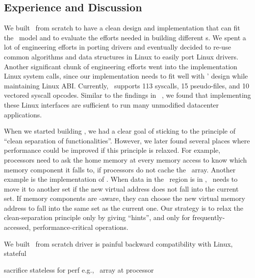 \documentclass[10pt,times,twocolumn]{z2-article}
\begin{document}
{{{{{{{\subsection{Experience and Discussion}
We built \lego\ from scratch to have a clean design and implementation that 
can fit the \splitkernel\ model
and to evaluate the efforts needed in building different \microos{}s.
We spent a lot of engineering efforts in porting drivers
and eventually decided to re-use common algorithms and data structures in Linux
to easily port Linux drivers.
Another significant chunk of engineering efforts went into 
the implementation Linux system calls, since our implementation needs 
to fit well with \lego{}' design while maintaining Linux ABI.
Currently, \lego\ supports 113 syscalls, 15 pseudo-files,
and 10 vectored syscall opcodes. 
Similar to the findings in ~\cite{tsai-eurosys16}, we found that implementing these Linux interfaces
are sufficient to run many unmodified datacenter applications.

When we started building \lego, we had a clear goal of sticking to
the principle of ``clean separation of functionalities''.
However, we later found several places where performance could be improved 
if this principle is relaxed.
For example, processors need to ask the home memory at every memory access to 
know which memory component it falls to, if processors do not cache the \vregion\ array.
Another example is the implementation of \mremap.
When data in the \mremap\ region is in \excache, 
\lego\ needs to move it to another set if the new virtual address does not fall into the 
current set.
If memory components are \excache-aware, they can choose the new virtual memory address
to fall into the same set as the current one.
Our strategy is to relax the clean-separation principle only by giving ``hints'', %
and only for frequently-accessed,
performance-critical operations.



We built \lego\ from scratch
driver is painful
backward compatibility with Linux, stateful

sacrifice stateless for perf
e.g., \vregion\ array at processor

}}}}}}}
\end{document}
